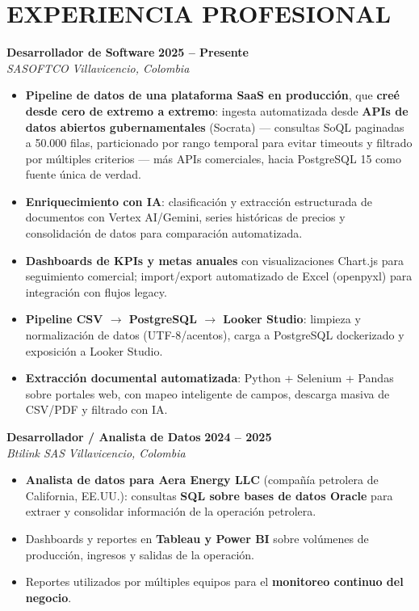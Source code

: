 \documentclass[letterpaper,10pt]{article}
\begin{document}
\section{EXPERIENCIA PROFESIONAL}

\textbf{Desarrollador de Software} \hfill \textbf{2025 -- Presente} \\
\textit{SASOFTCO} \hfill \textit{Villavicencio, Colombia}
\begin{itemize}
    \item \textbf{Pipeline de datos de una plataforma SaaS en producción}, que \textbf{creé desde cero de extremo a extremo}: ingesta automatizada desde \textbf{APIs de datos abiertos gubernamentales} (Socrata) — consultas SoQL paginadas a 50.000 filas, particionado por rango temporal para evitar timeouts y filtrado por múltiples criterios — más APIs comerciales, hacia PostgreSQL 15 como fuente única de verdad.
    \item \textbf{Enriquecimiento con IA}: clasificación y extracción estructurada de documentos con Vertex AI/Gemini, series históricas de precios y consolidación de datos para comparación automatizada.
    \item \textbf{Dashboards de KPIs y metas anuales} con visualizaciones Chart.js para seguimiento comercial; import/export automatizado de Excel (openpyxl) para integración con flujos legacy.
    \item \textbf{Pipeline CSV $\rightarrow$ PostgreSQL $\rightarrow$ Looker Studio}: limpieza y normalización de datos (UTF-8/acentos), carga a PostgreSQL dockerizado y exposición a Looker Studio.
    \item \textbf{Extracción documental automatizada}: Python + Selenium + Pandas sobre portales web, con mapeo inteligente de campos, descarga masiva de CSV/PDF y filtrado con IA.
\end{itemize}

\textbf{Desarrollador / Analista de Datos} \hfill \textbf{2024 -- 2025} \\
\textit{Btilink SAS} \hfill \textit{Villavicencio, Colombia}
\begin{itemize}
    \item \textbf{Analista de datos para Aera Energy LLC} (compañía petrolera de California, EE.UU.): consultas \textbf{SQL sobre bases de datos Oracle} para extraer y consolidar información de la operación petrolera.
    \item Dashboards y reportes en \textbf{Tableau y Power BI} sobre volúmenes de producción, ingresos y salidas de la operación.
    \item Reportes utilizados por múltiples equipos para el \textbf{monitoreo continuo del negocio}.
\end{itemize}
\end{document}
